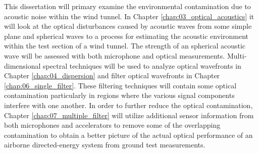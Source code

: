 This dissertation will primary examine the environmental contamination due to acoustic noise within the wind tunnel.
In Chapter \ref{chap:03_optical_acoustics} it will look at the optical disturbances caused by acoustic waves from some simple plane and spherical waves to a process for estimating the acoustic environment within the test section of a wind tunnel.
The strength of an spherical acoustic wave will be assessed with both microphone and optical measurements.
Multi-dimensional spectral techniques will be used to analyze optical wavefronts in Chapter \ref{chap:04_dispersion} and filter optical wavefronts in Chapter \ref{chap:06_single_filter}.
These filtering techniques will contain some optical contamination particularly in regions where the various signal components interfere with one another.
In order to further reduce the optical contamination, Chapter \ref{chap:07_multiple_filter} will utilize additional sensor information from both microphones and accelerators to remove some of the overlapping contamination to obtain a better picture of the actual optical performance of an airborne directed-energy system from ground test measurements.

